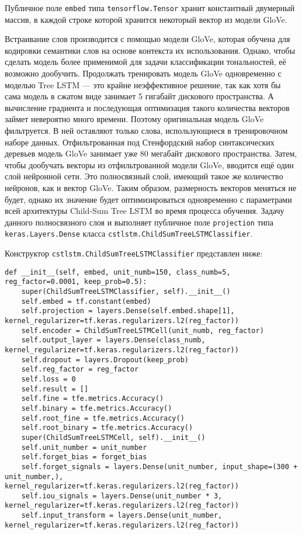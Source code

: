 Публичное поле \texttt{embed} типа \texttt{tensorflow.Tensor} хранит константный двумерный массив, в каждой строке которой хранится некоторый вектор из модели GloVe.

Встраивание слов производится с помощью модели GloVe, которая обучена для кодировки семантики слов на основе контекста их использования. Однако, чтобы сделать модель более применимой для задачи классификации тональностей, её возможно дообучить. Продолжать тренировать модель GloVe одновременно с моделью Tree LSTM --- это крайне неэффективное решение, так как хотя бы сама модель в сжатом виде занимает 5 гигабайт дискового пространства. А вычисление градиента и последующая оптимизация такого количества векторов займет невероятно много времени. Поэтому оригинальная модель GloVe фильтруется. В ней оставляют только слова, использующиеся в тренировочном наборе данных. Отфильтрованная под Стенфордский набор синтаксических деревьев модель GloVe занимает уже 80 мегабайт дискового пространства. Затем, чтобы дообучать векторы из отфильтрованной модели GloVe, вводится ещё один слой нейронной сети. Это полносвязный слой, имеющий такое же количество нейронов, как и вектор GloVe. Таким образом, размерность векторов меняться не будет, однако их значение будет  оптимизироваться одновременно с параметрами всей архитектуры Child-Sum Tree LSTM во время процесса обучения. Задачу данного полносвязного слоя и выполняет публичное поле \texttt{projection} типа \texttt{keras.La\-yers.Dense} класса \texttt{cstlstm.ChildSumTreeLSTMClassifier}.

Конструктор \texttt{cstlstm.ChildSumTreeLSTMClassifier} представлен ниже:
\medskip
\begin{lstlisting}[style=Python]
  def __init__(self, embed, unit_numb=150, class_numb=5, reg_factor=0.0001, keep_prob=0.5):
    super(ChildSumTreeLSTMClassifier, self).__init__()
    self.embed = tf.constant(embed)
    self.projection = layers.Dense(self.embed.shape[1], kernel_regularizer=tf.keras.regularizers.l2(reg_factor))
    self.encoder = ChildSumTreeLSTMCell(unit_numb, reg_factor)
    self.output_layer = layers.Dense(class_numb, kernel_regularizer=tf.keras.regularizers.l2(reg_factor))
    self.dropout = layers.Dropout(keep_prob)
    self.reg_factor = reg_factor
    self.loss = 0
    self.result = []
    self.fine = tfe.metrics.Accuracy()
    self.binary = tfe.metrics.Accuracy()
    self.root_fine = tfe.metrics.Accuracy()
    self.root_binary = tfe.metrics.Accuracy()
    super(ChildSumTreeLSTMCell, self).__init__()
    self.unit_number = unit_number
    self.forget_bias = forget_bias
    self.forget_signals = layers.Dense(unit_number, input_shape=(300 + unit_number,), kernel_regularizer=tf.keras.regularizers.l2(reg_factor))
    self.iou_signals = layers.Dense(unit_number * 3, kernel_regularizer=tf.keras.regularizers.l2(reg_factor))
    self.input_transform = layers.Dense(unit_number, kernel_regularizer=tf.keras.regularizers.l2(reg_factor))
\end{lstlisting}
\medskip

